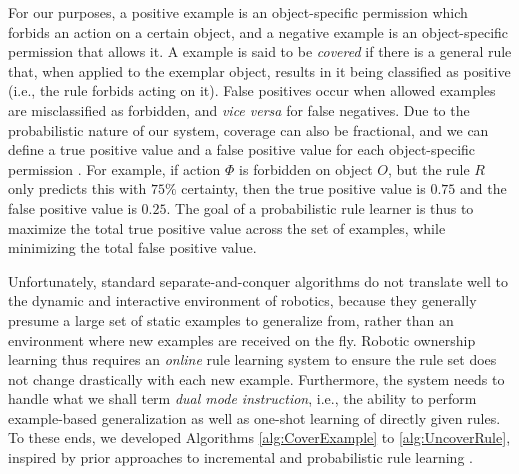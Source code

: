 \documentclass[letterpaper]{article} %
\begin{document}
For our purposes, a positive example is an object-specific permission which forbids an action on a certain object, and a negative example is an object-specific permission that allows it. A example is said to be \emph{covered} if there is a general rule that, when applied to the exemplar object, results in it being classified as positive (i.e., the rule forbids acting on it). False positives occur when allowed examples are misclassified as forbidden, and \emph{vice versa} for false negatives. Due to the probabilistic nature of our system, coverage can also be fractional, and we can define a true positive value and a false positive value for each object-specific permission \cite{de2015inducing}. For example, if action $\Phi$ is forbidden on object $O$, but the rule $R$ only predicts this with $75\%$ certainty, then the true positive value is $0.75$ and the false positive value is $0.25$. The goal of a probabilistic rule learner is thus to maximize the total true positive value across the set of examples, while minimizing the total false positive value.

Unfortunately, standard separate-and-conquer algorithms do not translate well to the dynamic and interactive environment of robotics, because they generally presume a large set of static examples to generalize from, rather than an environment where new examples are received on the fly. Robotic ownership learning thus requires an \emph{online} rule learning system to ensure the rule set does not change drastically with each new example. Furthermore, the system needs to handle what we shall term \emph{dual mode instruction}, i.e., the ability to perform example-based generalization as well as one-shot learning of directly given rules. To these ends, we developed Algorithms \ref{alg:CoverExample} to \ref{alg:UncoverRule}, inspired by prior approaches to incremental \cite{maloof2003incremental,hong1986aq15} and probabilistic rule learning \cite{de2010probabilistic,de2015inducing}.
\end{document}
